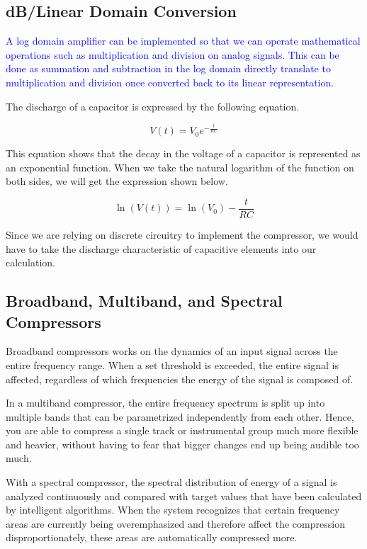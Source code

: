 \documentclass[10pt]{article}
\begin{document}
\begin{multicols}{2}
            \subsection{dB/Linear Domain Conversion}
                \textcolor{blue}{A log domain amplifier can be implemented so that we can operate mathematical operations such as multiplication and division on analog signals. This can be done as summation and subtraction in the log domain directly translate to multiplication and division once converted back to its linear representation.}

                The discharge of a capacitor is expressed by the following equation.              
                
                \begin{equation}
                    V(t) = V_0 e^{-\frac{t}{RC}}
                \end{equation}    
                
                This equation shows that the decay in the voltage of a capacitor is represented as an exponential function.
                When we take the natural logarithm of the function on both sides, we will get the expression shown below.
                
                \begin{equation}
                    \ln(V(t)) = \ln(V_0) - \frac{t}{RC}
                \end{equation}
                
                Since we are relying on discrete circuitry to implement the compressor, we would have to take the discharge characteristic of capacitive elements into our calculation.

            \subsection{Broadband, Multiband, and Spectral Compressors}
                Broadband compressors works on the dynamics of an input signal across the entire frequency range. When a set threshold is exceeded, the entire signal is affected, regardless of which frequencies the energy of the signal is composed of.\par
                In a multiband compressor, the entire frequency spectrum is split up into multiple bands that can be parametrized independently from each other. Hence, you are able to compress a single track or instrumental group much more flexible and heavier, without having to fear that bigger changes end up being audible too much.\par
                With a spectral compressor, the spectral distribution of energy of a signal is analyzed continuously and compared with target values that have been calculated by intelligent algorithms. When the system recognizes that certain frequency areas are currently being overemphasized and therefore affect the compression disproportionately, these areas are automatically compressed more.

\end{multicols}
\end{document}
